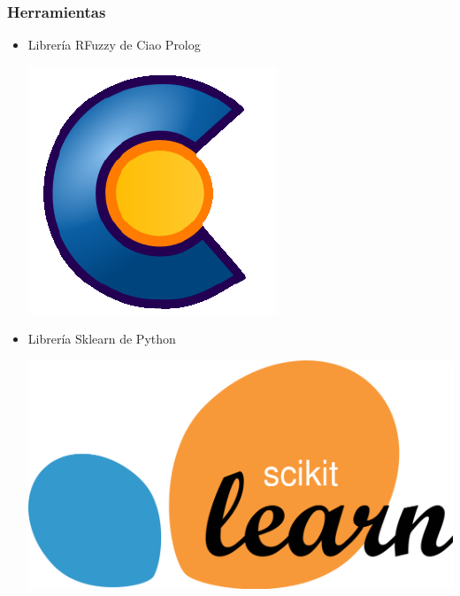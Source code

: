 \documentclass{beamer}
\newcommand{\slideauthor}[1]{\gdef\insertslideauthor{#1}}
\begin{document}
\begin{frame}
\frametitle{Herramientas}
\slideauthor{Diego Fogued}
\begin{itemize}
    \item \begin{minipage}[t]{0.8\linewidth}Librería RFuzzy de Ciao Prolog\end{minipage}\begin{minipage}[t]{0.1\linewidth}\includegraphics[width=\linewidth]{Images/ciao.png}\end{minipage}
    \vspace{0.25cm}
    \item \begin{minipage}[t]{0.8\linewidth}Librería Sklearn de Python\end{minipage}\begin{minipage}[t]{0.15\linewidth}\includegraphics[width=\linewidth]{Images/Sklearn.jpg}\end{minipage}

\end{itemize}
\end{frame}
\end{document}
